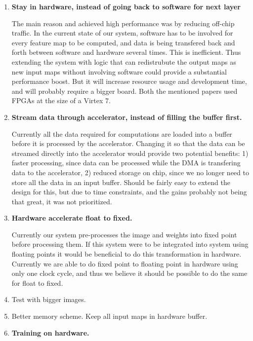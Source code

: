 \begin{enumerate}
	\item \textbf{Stay in hardware, instead of going back to software for next layer}
	
	The main reason \cite{Zhang2015} and \cite{Ovtcharov2015} achieved high performance was by reducing off-chip traffic. In the current state of our system, software has to be involved for every feature map to be computed, and data is being transfered back and forth between software and hardware several times. This is inefficient. Thus extending the system with logic that can redistrubute the output maps as new input maps without involving software could provide a substantial performance boost. But it will increase resource usage and development time, and will probably require a bigger board. Both the mentioned papers used FPGAs at the size of a Virtex 7.  
	
	\item \textbf{Stream data through accelerator, instead of filling the buffer first.}
	
	Currently all the data required for computations are loaded into a buffer before it is processed by the accelerator. Changing it so that the data can be streamed directly into the accelerator would provide two potential benefits: 1) faster processing, since data can be processed while the DMA is transfering data to the accelerator, 2) reduced storage on chip, since we no longer need to store all the data in an input buffer. Should be fairly easy to extend the design for this, but due to time constraints, and the gains probably not being that great, it was not prioritized. 
	
	\item \textbf{Hardware accelerate float to fixed.}
	
	Currently our system pre-processes the image and weights into fixed point before processing them. If this system were to be integrated into system using floating points it would be beneficial to do this transformation in hardware. Currently we are able to do fixed point to floating point in hardware using only one clock cycle, and thus we believe it should be possible to do the same for float to fixed. 

  \item Test with bigger images.

    \item Better memory scheme. Keep all input maps in hardware buffer. 
    
	\item \textbf{Training on hardware.}
	
\end{enumerate}
